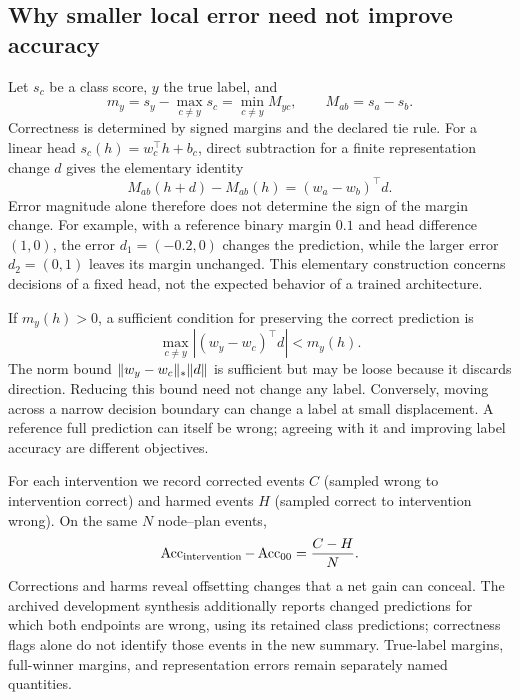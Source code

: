 \subsection{Why smaller local error need not improve accuracy}
Let $s_c$ be a class score, $y$ the true label, and
\begin{equation}
m_y=s_y-\max_{c\ne y}s_c=\min_{c\ne y} M_{yc},\qquad M_{ab}=s_a-s_b.
\end{equation}
Correctness is determined by signed margins and the declared tie rule. For a linear head $s_c(h)=w_c^\top h+b_c$, direct subtraction for a finite representation change $d$ gives the elementary identity
\begin{equation}
M_{ab}(h+d)-M_{ab}(h)=(w_a-w_b)^\top d.
\label{eq:euclideanmargin}
\end{equation}
Error magnitude alone therefore does not determine the sign of the margin change. For example, with a reference binary margin $0.1$ and head difference $(1,0)$, the error $d_1=(-0.2,0)$ changes the prediction, while the larger error $d_2=(0,1)$ leaves its margin unchanged. This elementary construction concerns decisions of a fixed head, not the expected behavior of a trained architecture.

If $m_y(h)>0$, a sufficient condition for preserving the correct prediction is
\begin{equation}
\max_{c\ne y}\left|(w_y-w_c)^\top d\right|<m_y(h).
\label{eq:stability}
\end{equation}
The norm bound $\lVert w_y-w_c\rVert_*\lVert d\rVert$ is sufficient but may be loose because it discards direction. Reducing this bound need not change any label. Conversely, moving across a narrow decision boundary can change a label at small displacement. A reference full prediction can itself be wrong; agreeing with it and improving label accuracy are different objectives.

For each intervention we record corrected events $C$ (sampled wrong to intervention correct) and harmed events $H$ (sampled correct to intervention wrong). On the same $N$ node--plan events,
\begin{equation}
\operatorname{Acc}_{\mathrm{intervention}}-\operatorname{Acc}_{00}=\frac{C-H}{N}.
\label{eq:transitions}
\end{equation}
Corrections and harms reveal offsetting changes that a net gain can conceal. The archived development synthesis additionally reports changed predictions for which both endpoints are wrong, using its retained class predictions; correctness flags alone do not identify those events in the new summary. True-label margins, full-winner margins, and representation errors remain separately named quantities.


